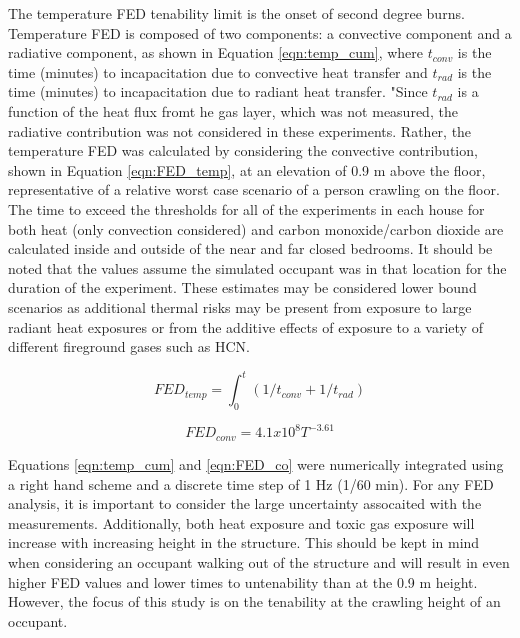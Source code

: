 \documentclass[12pt,oneside]{article}
\begin{document}
The temperature FED tenability limit is the onset of second degree burns. Temperature FED is composed of two components: a convective component and a radiative component, as shown in Equation \ref{eqn:temp_cum}, where $t_{conv}$ is the time (minutes) to incapacitation due to convective heat transfer and $t_{rad}$ is the time (minutes) to incapacitation due to radiant heat transfer. "Since $t_{rad}$ is a function of the heat flux fromt he gas layer, which was not measured, the radiative contribution was not considered in these experiments. Rather, the temperature FED was calculated by considering the convective contribution, shown in Equation \ref{eqn:FED_temp}, at an elevation of 0.9 m above the floor, representative of a relative worst case scenario of a person crawling on the floor. The time to exceed the thresholds for all of the experiments in each house for both heat (only convection considered) and carbon monoxide/carbon dioxide are calculated inside and outside of the near and far closed bedrooms.   It should be noted that the values assume the simulated occupant was in that location for the duration of the experiment. These estimates may be considered lower bound scenarios as additional thermal risks may be present from exposure to large radiant heat exposures or from the additive effects of exposure to a variety of different fireground gases such as HCN.  


\begin{equation}\label{eqn:temp_cum}FED_{temp}=\int_{0}^{t}(1/t_{conv}+1/t_{rad})\end{equation}

\begin{equation}\label{eqn:FED_temp}FED_{conv}=4.1x10^8{T^{-3.61}}\end{equation}



Equations \ref{eqn:temp_cum} and \ref{eqn:FED_co} were numerically integrated using a right hand scheme and a discrete time step of 1 Hz (1/60 min). For any FED analysis, it is important to consider the large uncertainty assocaited with the measurements. Additionally, both heat exposure and toxic gas exposure will increase with increasing height in the structure. This should be kept in mind when considering an occupant walking out of the structure and will result in even higher FED values and lower times to untenability than at the 0.9 m height. However, the focus of this study is on the tenability at the crawling height of an occupant.
\end{document}
